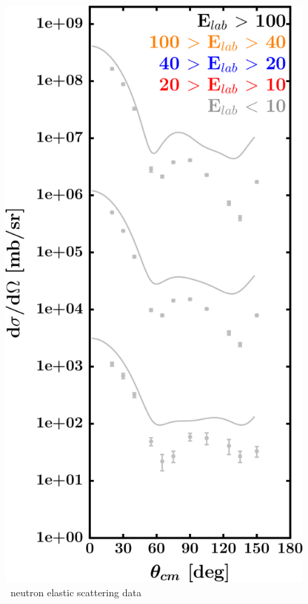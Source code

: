 \begin{figure}[H]
\begin{minipage}{0.45\textwidth}
        \includegraphics[width=1.0\textwidth]{figures/ni64_neutronElastic.png}
        \caption{\niFour\ neutron elastic scattering data}
        \label{DOMFitData_ni64_neutron_elastic}
    \end{minipage}
\end{figure}


